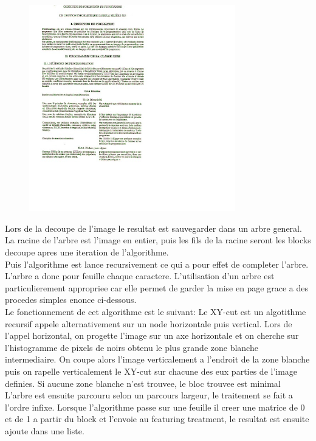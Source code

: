 \begin{figure}[h]
    \centering
    \includegraphics[width =0.80\textwidth]{dst2.jpg}
\end{figure}
Lors de la decoupe de l'image le resultat est sauvegarder dans un arbre general. La racine de l'arbre est l'image en entier, puis les fils de la racine seront les blocks decoupe apres une iteration de l'algorithme.\\
Puis l'algorithme est lance recursivement ce qui a pour effet de completer l'arbre. L'arbre a donc pour feuille chaque caractere. L'utilisation d'un arbre est particulierement appropriee car elle permet de garder la mise en page grace a des procedes simples enonce ci-dessous.\\
Le fonctionnement de cet algorithme est le suivant: Le XY-cut est un algotithme recursif appele alternativement sur un node horizontale puis vertical. Lors de l'appel horizontal, on progette l'image sur un axe horizontale et on cherche sur l'histogramme de pixels de noirs obtenu le plus grande zone blanche intermediaire. On coupe alors l'image verticalement a l'endroit de la zone blanche puis on rapelle verticalement le XY-cut sur chacune des eux parties de l'image definies. Si aucune zone blanche n'est trouvee, le bloc trouvee est minimal\\
L'arbre est ensuite parcouru selon un parcours largeur, le traitement se fait a l'ordre infixe. Lorsque l'algorithme passe sur une feuille il creer une matrice de 0 et de 1 a partir du block et l'envoie au featuring treatment, le resultat est ensuite ajoute dans une liste. \\

